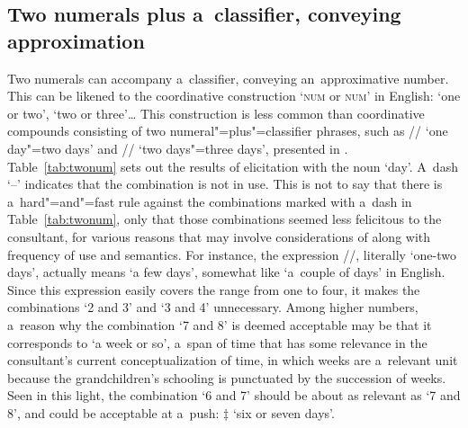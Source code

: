 
\subsection[Two numerals plus a~classifier]{Two numerals plus a~classifier, conveying approximation}
\label{sec:twonumerals}

Two numerals can accompany a~classifier, conveying an~approximative number. This can be likened to the coordinative construction ‘\textsc{num} or \textsc{num}’ in {English}: ‘one or two’, ‘two or three’{\dots} This construction is less common than coordinative compounds consisting of two numeral"=plus"=classifier phrases, such as // ‘one day"=two days’ and // ‘two days"=three days’, presented in . Table~\ref{tab:twonum} sets out the results of elicitation with the noun ‘day’. A~dash ‘--’ indicates that the combination is not in use. This is not to say that there is a~hard"=and"=fast rule against the combinations marked with a~dash in Table~\ref{tab:twonum}, only that those combinations seemed less felicitous to the consultant, for various reasons that may involve considerations of  along with frequency of use and semantics. For instance, the expression //, literally ‘one-two days’, actually means ‘a few days’, somewhat like ‘a~couple of days’ in {English}. Since this expression easily covers the range from one to four, it makes the combinations ‘2 and 3’ and ‘3 and 4’ unnecessary. Among higher numbers, a~reason why the combination ‘7 and 8’ is deemed acceptable may be that it corresponds to ‘a week or so’, a~span of time that has some relevance in the consultant's current conceptualization of time, in which weeks are a~relevant unit because the grandchildren's schooling is punctuated by the succession of weeks. Seen in this light, the combination ‘6 and 7’ should be about as relevant as ‘7 and 8’, and could be acceptable at a~push: $\ddagger${\kern2pt} ‘six or seven days’.

